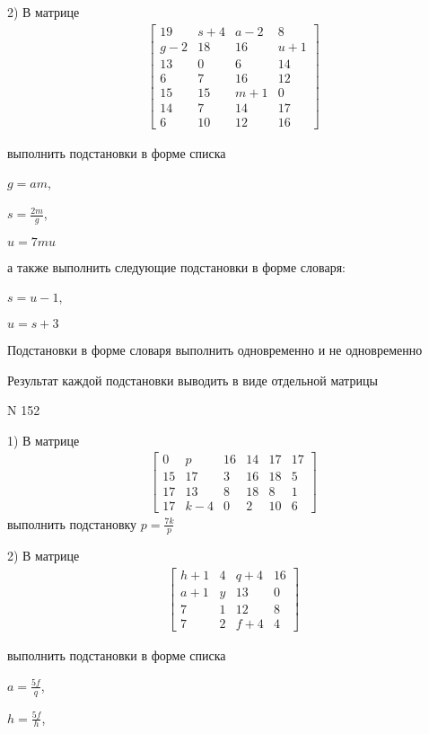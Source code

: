 \documentclass[11pt]{report}
\begin{document}
    2) В матрице
\begin{align*}
\left[\begin{matrix}19 & s + 4 & a - 2 & 8\\g - 2 & 18 & 16 & u + 1\\13 & 0 & 6 & 14\\6 & 7 & 16 & 12\\15 & 15 & m + 1 & 0\\14 & 7 & 14 & 17\\6 & 10 & 12 & 16\end{matrix}\right]
\end{align*}

выполнить подстановки в форме списка

$g=a m$,

$s=\frac{2 m}{g}$,

$u=7 m u$

а также выполнить следующие подстановки в форме словаря:

$s=u - 1$,

$u=s + 3$


    Подстановки в форме словаря выполнить одновременно и не одновременно


    Результат каждой подстановки выводить в виде отдельной матрицы

\newpage
N 152


    1) В матрице
\begin{align*}
\left[\begin{matrix}0 & p & 16 & 14 & 17 & 17\\15 & 17 & 3 & 16 & 18 & 5\\17 & 13 & 8 & 18 & 8 & 1\\17 & k - 4 & 0 & 2 & 10 & 6\end{matrix}\right]
\end{align*}
выполнить подстановку $p=\frac{7 k}{p}$


    2) В матрице
\begin{align*}
\left[\begin{matrix}h + 1 & 4 & q + 4 & 16\\a + 1 & y & 13 & 0\\7 & 1 & 12 & 8\\7 & 2 & f + 4 & 4\end{matrix}\right]
\end{align*}

выполнить подстановки в форме списка

$a=\frac{5 f}{q}$,

$h=\frac{5 f}{h}$,
\end{document}
